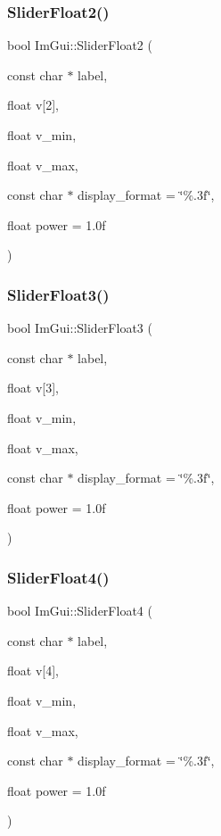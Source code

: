 \subsubsection{\texorpdfstring{Slider\+Float2()}{SliderFloat2()}}
{\footnotesize\ttfamily bool Im\+Gui\+::\+Slider\+Float2 (\begin{DoxyParamCaption}\item[{const char $\ast$}]{label,  }\item[{float}]{v\mbox{[}2\mbox{]},  }\item[{float}]{v\+\_\+min,  }\item[{float}]{v\+\_\+max,  }\item[{const char $\ast$}]{display\+\_\+format = {\ttfamily \char`\"{}\%.3f\char`\"{}},  }\item[{float}]{power = {\ttfamily 1.0f} }\end{DoxyParamCaption})}

\hypertarget{namespace_im_gui_aab33732d7951627f9c32d708f263889f}{}\label{namespace_im_gui_aab33732d7951627f9c32d708f263889f} 
\subsubsection{\texorpdfstring{Slider\+Float3()}{SliderFloat3()}}
{\footnotesize\ttfamily bool Im\+Gui\+::\+Slider\+Float3 (\begin{DoxyParamCaption}\item[{const char $\ast$}]{label,  }\item[{float}]{v\mbox{[}3\mbox{]},  }\item[{float}]{v\+\_\+min,  }\item[{float}]{v\+\_\+max,  }\item[{const char $\ast$}]{display\+\_\+format = {\ttfamily \char`\"{}\%.3f\char`\"{}},  }\item[{float}]{power = {\ttfamily 1.0f} }\end{DoxyParamCaption})}

\hypertarget{namespace_im_gui_aab6b7e99cab3975fece12fb1cd56e281}{}\label{namespace_im_gui_aab6b7e99cab3975fece12fb1cd56e281} 
\subsubsection{\texorpdfstring{Slider\+Float4()}{SliderFloat4()}}
{\footnotesize\ttfamily bool Im\+Gui\+::\+Slider\+Float4 (\begin{DoxyParamCaption}\item[{const char $\ast$}]{label,  }\item[{float}]{v\mbox{[}4\mbox{]},  }\item[{float}]{v\+\_\+min,  }\item[{float}]{v\+\_\+max,  }\item[{const char $\ast$}]{display\+\_\+format = {\ttfamily \char`\"{}\%.3f\char`\"{}},  }\item[{float}]{power = {\ttfamily 1.0f} }\end{DoxyParamCaption})}

